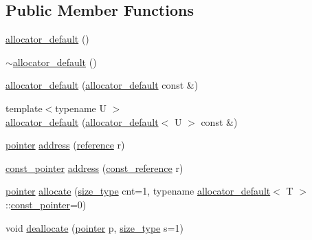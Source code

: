 \subsection*{Public Member Functions}
\begin{DoxyCompactItemize}
\item 
\hyperlink{classcrap_1_1allocator__default_a4f340849426c8ff0c13df89e0612ff59}{allocator\-\_\-default} ()
\item 
\hyperlink{classcrap_1_1allocator__default_a30b79867a19b6c0107ffd04aa73fa810}{$\sim$allocator\-\_\-default} ()
\item 
\hyperlink{classcrap_1_1allocator__default_aa906119cd65744878f2d70a9a7aedfdd}{allocator\-\_\-default} (\hyperlink{classcrap_1_1allocator__default}{allocator\-\_\-default} const \&)
\item 
{\footnotesize template$<$typename U $>$ }\\\hyperlink{classcrap_1_1allocator__default_a8e0aef23c95f94452fe95e64ff5f9478}{allocator\-\_\-default} (\hyperlink{classcrap_1_1allocator__default}{allocator\-\_\-default}$<$ U $>$ const \&)
\item 
\hyperlink{classcrap_1_1allocator__default_a10c26486aa6c8e7b9b1cb7fa1a10b3bd}{pointer} \hyperlink{classcrap_1_1allocator__default_af073258a1e25c7830603d4519413d555}{address} (\hyperlink{classcrap_1_1allocator__default_a58372b140fc5c63e4be9ce32b93ec942}{reference} r)
\item 
\hyperlink{classcrap_1_1allocator__default_af76e09c744d25c384dd12e3353c60733}{const\-\_\-pointer} \hyperlink{classcrap_1_1allocator__default_a1dd8eb369978bd51171e94afa3ca6b58}{address} (\hyperlink{classcrap_1_1allocator__default_a8d3c37bc5001cad948974ad3a0faade5}{const\-\_\-reference} r)
\item 
\hyperlink{classcrap_1_1allocator__default_a10c26486aa6c8e7b9b1cb7fa1a10b3bd}{pointer} \hyperlink{classcrap_1_1allocator__default_a65b080ea8495b5a2b3a4443929e08599}{allocate} (\hyperlink{classcrap_1_1allocator__default_aec0689db195f5f8ce40f789b17ab4d55}{size\-\_\-type} cnt=1, typename \hyperlink{classcrap_1_1allocator__default}{allocator\-\_\-default}$<$ T $>$\-::\hyperlink{classcrap_1_1allocator__default_af76e09c744d25c384dd12e3353c60733}{const\-\_\-pointer}=0)
\item 
void \hyperlink{classcrap_1_1allocator__default_a3095683564fb77b535ede872a0bcfb58}{deallocate} (\hyperlink{classcrap_1_1allocator__default_a10c26486aa6c8e7b9b1cb7fa1a10b3bd}{pointer} p, \hyperlink{classcrap_1_1allocator__default_aec0689db195f5f8ce40f789b17ab4d55}{size\-\_\-type} s=1)

\end{DoxyCompactItemize}
